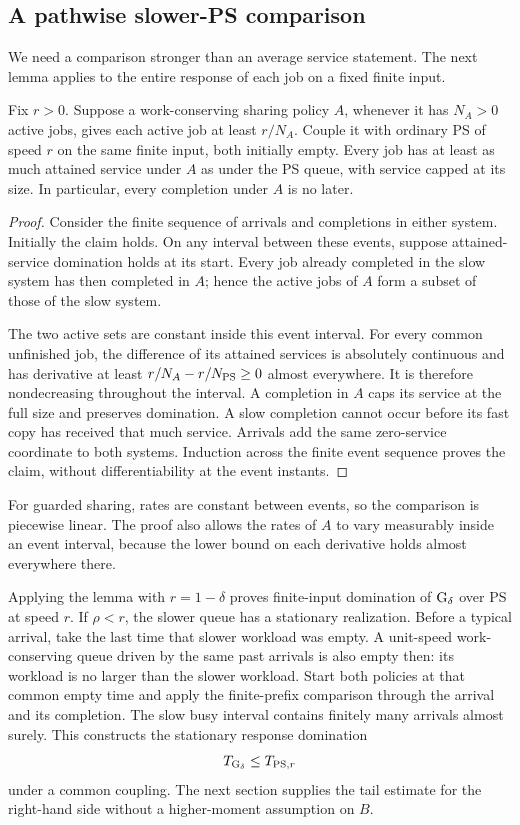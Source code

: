 \subsection{A pathwise slower-PS comparison}\label{sec:domination}
We need a comparison stronger than an average service statement. The next lemma applies to the entire response of each job on a fixed finite input.

\begin{lemma}\label{lem:ps-domination}
Fix $r>0$. Suppose a work-conserving sharing policy $A$, whenever it has $N_A>0$ active jobs, gives each active job at least $r/N_A$. Couple it with ordinary PS of speed $r$ on the same finite input, both initially empty. Every job has at least as much attained service under $A$ as under the PS queue, with service capped at its size. In particular, every completion under $A$ is no later.
\end{lemma}
\begin{proof}
Consider the finite sequence of arrivals and completions in either system. Initially the claim holds. On any interval between these events, suppose attained-service domination holds at its start. Every job already completed in the slow system has then completed in $A$; hence the active jobs of $A$ form a subset of those of the slow system.

The two active sets are constant inside this event interval. For every common unfinished job, the difference of its attained services is absolutely continuous and has derivative at least $r/N_A-r/N_{\operatorname{PS}}\geq0$ almost everywhere. It is therefore nondecreasing throughout the interval. A completion in $A$ caps its service at the full size and preserves domination. A slow completion cannot occur before its fast copy has received that much service. Arrivals add the same zero-service coordinate to both systems. Induction across the finite event sequence proves the claim, without differentiability at the event instants.
\end{proof}

For guarded sharing, rates are constant between events, so the comparison is piecewise linear. The proof also allows the rates of $A$ to vary measurably inside an event interval, because the lower bound on each derivative holds almost everywhere there.

Applying the lemma with $r=1-\delta$ proves finite-input domination of $\operatorname{G}_\delta$ over PS at speed $r$. If $\rho<r$, the slower queue has a stationary realization. Before a typical arrival, take the last time that slower workload was empty. A unit-speed work-conserving queue driven by the same past arrivals is also empty then: its workload is no larger than the slower workload. Start both policies at that common empty time and apply the finite-prefix comparison through the arrival and its completion. The slow busy interval contains finitely many arrivals almost surely. This constructs the stationary response domination
\begin{equation}\label{eq:stationary-domination}
 T_{\operatorname{G}_\delta}\leq T_{\operatorname{PS},r}
\end{equation}
under a common coupling. The next section supplies the tail estimate for the right-hand side without a higher-moment assumption on $B$.
